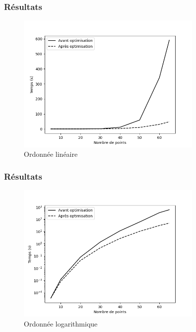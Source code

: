 \documentclass{beamer}
\begin{document}
\begin{frame}
    \frametitle{Résultats}
    \begin{figure}%
        \centering
        \includegraphics[width=0.8\textwidth]{../images/analyse_cmpx.png}
        \caption{Ordonnée linéaire}
    \end{figure}
\end{frame}

\begin{frame}
    \frametitle{Résultats}
    \begin{figure}%
        \centering
        \includegraphics[width=0.8\textwidth]{../images/analyse_cmpx_log.png}
        \caption{Ordonnée logarithmique}
    \end{figure}
\end{frame}
\end{document}
